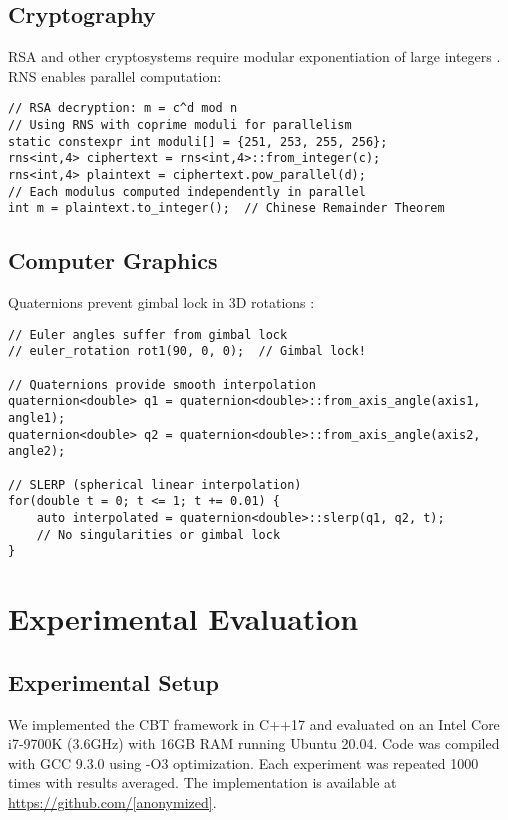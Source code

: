 \documentclass[12pt,a4paper]{article}
\theoremstyle{definition}
\begin{document}
\subsection{Cryptography}

RSA and other cryptosystems require modular exponentiation of large integers \cite{rivest1978method}. RNS enables parallel computation:

\begin{lstlisting}[caption={Parallel RSA decryption using RNS}]
// RSA decryption: m = c^d mod n
// Using RNS with coprime moduli for parallelism
static constexpr int moduli[] = {251, 253, 255, 256};
rns<int,4> ciphertext = rns<int,4>::from_integer(c);
rns<int,4> plaintext = ciphertext.pow_parallel(d);  
// Each modulus computed independently in parallel
int m = plaintext.to_integer();  // Chinese Remainder Theorem
\end{lstlisting}

\subsection{Computer Graphics}

Quaternions prevent gimbal lock in 3D rotations \cite{shoemake1985animating}:

\begin{lstlisting}[caption={Smooth rotation interpolation using quaternions}]
// Euler angles suffer from gimbal lock
// euler_rotation rot1(90, 0, 0);  // Gimbal lock!

// Quaternions provide smooth interpolation  
quaternion<double> q1 = quaternion<double>::from_axis_angle(axis1, angle1);
quaternion<double> q2 = quaternion<double>::from_axis_angle(axis2, angle2);

// SLERP (spherical linear interpolation)
for(double t = 0; t <= 1; t += 0.01) {
    auto interpolated = quaternion<double>::slerp(q1, q2, t);
    // No singularities or gimbal lock
}
\end{lstlisting}

\section{Experimental Evaluation}

\subsection{Experimental Setup}

We implemented the CBT framework in C++17 and evaluated on an Intel Core i7-9700K (3.6GHz) with 16GB RAM running Ubuntu 20.04. Code was compiled with GCC 9.3.0 using -O3 optimization. Each experiment was repeated 1000 times with results averaged. The implementation is available at \url{https://github.com/[anonymized]}.
\end{document}
